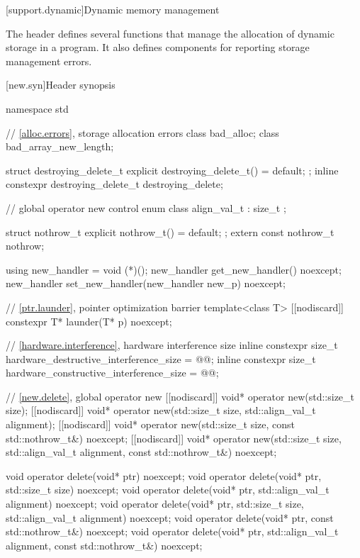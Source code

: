 
[support.dynamic]{Dynamic memory management}

\pnum
The header  defines several
functions that manage the allocation of dynamic storage in a program.
It also defines components for reporting storage management errors.

[new.syn]{Header  synopsis}
\begin{codeblock}
namespace std {
  // \ref{alloc.errors}, storage allocation errors 
  class bad_alloc;
  class bad_array_new_length;

  struct destroying_delete_t {
    explicit destroying_delete_t() = default;
  };
  inline constexpr destroying_delete_t destroying_delete{};

  // global operator new control%
  enum class align_val_t : size_t {};

  struct nothrow_t { explicit nothrow_t() = default; };
  extern const nothrow_t nothrow;

  using new_handler = void (*)();
  new_handler get_new_handler() noexcept;
  new_handler set_new_handler(new_handler new_p) noexcept;

  // \ref{ptr.launder}, pointer optimization barrier
  template<class T> [[nodiscard]] constexpr T* launder(T* p) noexcept;

  // \ref{hardware.interference}, hardware interference size
  inline constexpr size_t hardware_destructive_interference_size = @\impdef{}@;
  inline constexpr size_t hardware_constructive_interference_size = @\impdef{}@;
}

// \ref{new.delete}, global operator new
[[nodiscard]] void* operator new(std::size_t size);
[[nodiscard]] void* operator new(std::size_t size, std::align_val_t alignment);
[[nodiscard]] void* operator new(std::size_t size, const std::nothrow_t&) noexcept;
[[nodiscard]] void* operator new(std::size_t size, std::align_val_t alignment,
                                 const std::nothrow_t&) noexcept;

void  operator delete(void* ptr) noexcept;
void  operator delete(void* ptr, std::size_t size) noexcept;
void  operator delete(void* ptr, std::align_val_t alignment) noexcept;
void  operator delete(void* ptr, std::size_t size, std::align_val_t alignment) noexcept;
void  operator delete(void* ptr, const std::nothrow_t&) noexcept;
void  operator delete(void* ptr, std::align_val_t alignment, const std::nothrow_t&) noexcept;


\end{codeblock}
